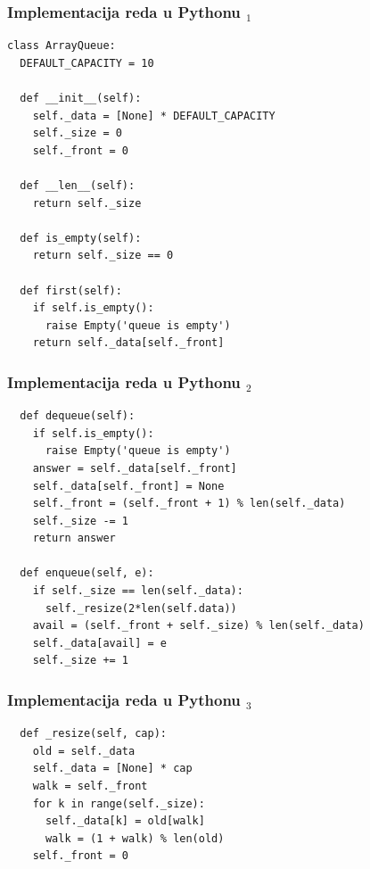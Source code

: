 \documentclass[compress]{beamer}
\begin{document}
\begin{frame}[fragile,shrink=10]
  \frametitle{Implementacija reda u Pythonu $_1$}
\begin{verbatim}
class ArrayQueue:
  DEFAULT_CAPACITY = 10

  def __init__(self):
    self._data = [None] * DEFAULT_CAPACITY
    self._size = 0
    self._front = 0
    
  def __len__(self):
    return self._size
  
  def is_empty(self):
    return self._size == 0
    
  def first(self):
    if self.is_empty():
      raise Empty('queue is empty')
    return self._data[self._front]

\end{verbatim}
\end{frame}

\begin{frame}[fragile,shrink=10]
  \frametitle{Implementacija reda u Pythonu $_2$}
\begin{verbatim}
  def dequeue(self):
    if self.is_empty():
      raise Empty('queue is empty')
    answer = self._data[self._front]
    self._data[self._front] = None
    self._front = (self._front + 1) % len(self._data)
    self._size -= 1
    return answer

  def enqueue(self, e):
    if self._size == len(self._data):
      self._resize(2*len(self.data))
    avail = (self._front + self._size) % len(self._data)
    self._data[avail] = e
    self._size += 1
\end{verbatim}
\end{frame}

\begin{frame}[fragile,shrink=10]
  \frametitle{Implementacija reda u Pythonu $_3$}
\begin{verbatim}
  def _resize(self, cap):
    old = self._data
    self._data = [None] * cap
    walk = self._front
    for k in range(self._size):
      self._data[k] = old[walk]
      walk = (1 + walk) % len(old)
    self._front = 0 
\end{verbatim}
\end{frame}
\end{document}
